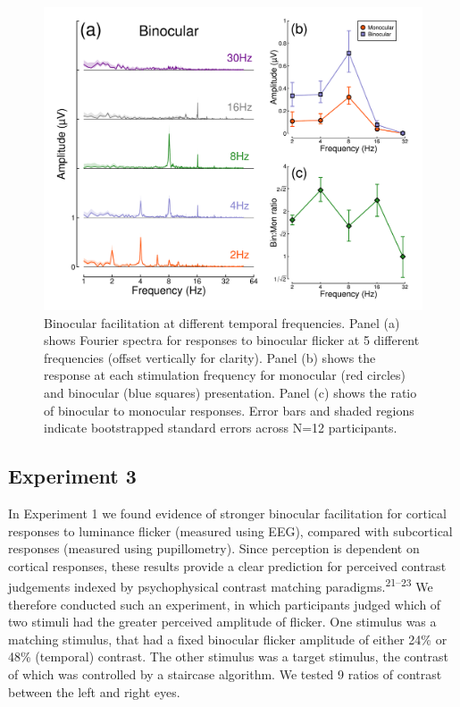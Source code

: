 \documentclass[
]{article}
\begin{document}
\begin{figure}

{\centering \includegraphics{Figures/TFdata} 

}

\caption{Binocular facilitation at different temporal frequencies. Panel (a) shows Fourier spectra for responses to binocular flicker at 5 different frequencies (offset vertically for clarity). Panel (b) shows the response at each stimulation frequency for monocular (red circles) and binocular (blue squares) presentation. Panel (c) shows the ratio of binocular to monocular responses. Error bars and shaded regions indicate bootstrapped standard errors across N=12 participants.}\label{fig:TFdata}
\end{figure}

\hypertarget{experiment-3}{%
\subsection{Experiment 3}\label{experiment-3}}

In Experiment 1 we found evidence of stronger binocular facilitation for cortical responses to luminance flicker (measured using EEG), compared with subcortical responses (measured using pupillometry). Since perception is dependent on cortical responses, these results provide a clear prediction for perceived contrast judgements indexed by psychophysical contrast matching paradigms.\textsuperscript{21--23} We therefore conducted such an experiment, in which participants judged which of two stimuli had the greater perceived amplitude of flicker. One stimulus was a matching stimulus, that had a fixed binocular flicker amplitude of either 24\% or 48\% (temporal) contrast. The other stimulus was a target stimulus, the contrast of which was controlled by a staircase algorithm. We tested 9 ratios of contrast between the left and right eyes.
\end{document}
